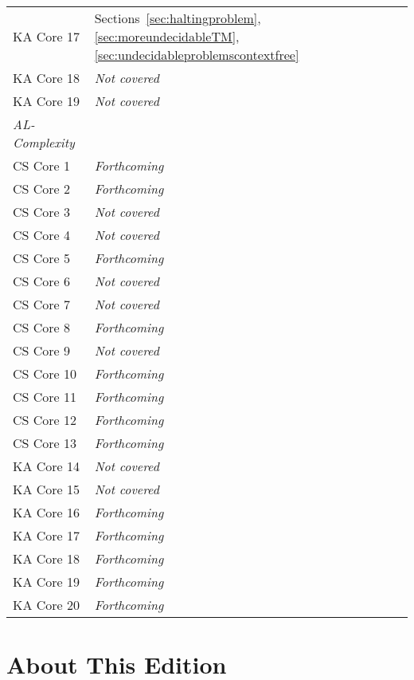 \begin{table}[p]
\begin{tabular}{p{4cm} p{5cm}}
KA Core 17				& Sections~\ref{sec:haltingproblem}, \ref{sec:moreundecidableTM}, \ref{sec:undecidableproblemscontextfree} \\
KA Core 18				& \textcolor{\neutralcolour}{\textit{Not covered}} \\
KA Core 19				& \textcolor{\neutralcolour}{\textit{Not covered}} \\
\midrule
\textit{AL-Complexity}		& \\
CS Core 1					& \textit{Forthcoming} \\
CS Core 2					& \textit{Forthcoming} \\
CS Core 3					& \textcolor{\neutralcolour}{\textit{Not covered}} \\
CS Core 4					& \textcolor{\neutralcolour}{\textit{Not covered}} \\
CS Core 5					& \textit{Forthcoming} \\
CS Core 6					& \textcolor{\neutralcolour}{\textit{Not covered}} \\
CS Core 7					& \textcolor{\neutralcolour}{\textit{Not covered}} \\
CS Core 8					& \textit{Forthcoming} \\
CS Core 9					& \textcolor{\neutralcolour}{\textit{Not covered}} \\
CS Core 10				& \textit{Forthcoming} \\
CS Core 11				& \textit{Forthcoming} \\
CS Core 12				& \textit{Forthcoming} \\
CS Core 13				& \textit{Forthcoming} \\
KA Core 14				& \textcolor{\neutralcolour}{\textit{Not covered}} \\
KA Core 15				& \textcolor{\neutralcolour}{\textit{Not covered}} \\
KA Core 16				& \textit{Forthcoming} \\
KA Core 17				& \textit{Forthcoming} \\
KA Core 18				& \textit{Forthcoming} \\
KA Core 19				& \textit{Forthcoming} \\
KA Core 20				& \textit{Forthcoming} \\
\bottomrule
\end{tabular}
\end{table}

\section*{About This Edition}

